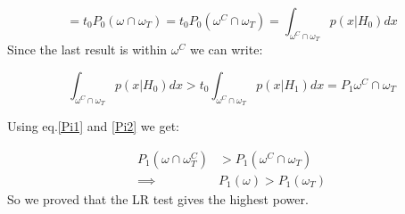 \documentclass{article}
\begin{document}
\begin{equation*}
    = t_0 P_0(\omega \cap \omega_T) = t_0 P_0(\omega^C \cap \omega_T) = \int_{\omega^C \cap \omega_T}{p(x|H_0)dx}
\end{equation*}
Since the last result is within $\omega^C$ we can write:

\begin{equation*}
    \int_{\omega^C \cap \omega_T}{p(x|H_0)dx} > t_0 \int_{\omega^C \cap \omega_T}{p(x|H_1)dx}=P_1{\omega^C \cap \omega_T}
\end{equation*}

Using eq.\ref{Pi1} and \ref{Pi2} we get:

\begin{align*}
    P_1(\omega \cap \omega_T^C) & > P_1(\omega^C \cap \omega_T) \\
    \implies & P_1(\omega) > P_1(\omega_T)
\end{align*}
So we proved that the LR test gives the highest power.
\end{document}
